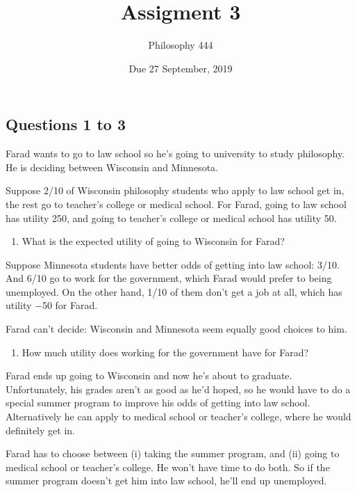 \documentclass[11pt,]{article}
\title{Assigment 3}
\author{Philosophy 444}
\date{Due 27 September, 2019}
\providecommand{\tightlist}{%
  \setlength{\itemsep}{0pt}\setlength{\parskip}{0pt}}
\begin{document}
\maketitle

\hypertarget{questions-1-to-3}{%
\subsection{Questions 1 to 3}\label{questions-1-to-3}}

Farad wants to go to law school so he's going to university to study
philosophy. He is deciding between Wisconsin and Minnesota.

Suppose 2/10 of Wisconsin philosophy students who apply to law school
get in, the rest go to teacher's college or medical school. For Farad,
going to law school has utility 250, and going to teacher's college or
medical school has utility 50.

\begin{enumerate}
\def\labelenumi{\arabic{enumi}.}
\tightlist
\item
  What is the expected utility of going to Wisconsin for Farad?
\end{enumerate}

Suppose Minnesota students have better odds of getting into law school:
3/10. And 6/10 go to work for the government, which Farad would prefer
to being unemployed. On the other hand, 1/10 of them don't get a job at
all, which has utility −50 for Farad.

Farad can't decide: Wisconsin and Minnesota seem equally good choices to
him.

\begin{enumerate}
\def\labelenumi{\arabic{enumi}.}
\setcounter{enumi}{1}
\tightlist
\item
  How much utility does working for the government have for Farad?
\end{enumerate}

Farad ends up going to Wisconsin and now he's about to graduate.
Unfortunately, his grades aren't as good as he'd hoped, so he would have
to do a special summer program to improve his odds of getting into law
school. Alternatively he can apply to medical school or teacher's
college, where he would definitely get in.

Farad has to choose between (i) taking the summer program, and (ii)
going to medical school or teacher's college. He won't have time to do
both. So if the summer program doesn't get him into law school, he'll
end up unemployed.
\end{document}
